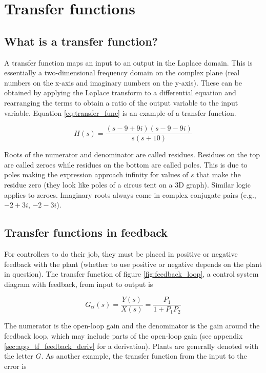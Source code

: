 \section{Transfer functions}

\subsection{What is a transfer function?}

A transfer function maps an input to an output in the Laplace domain. This is
essentially a two-dimensional frequency domain on the complex plane (real
numbers on the x-axis and imaginary numbers on the y-axis). These can be
obtained by applying the Laplace transform to a differential equation and
rearranging the terms to obtain a ratio of the output variable to the input
variable. Equation \ref{eq:transfer_func} is an example of a transfer function.

\begin{equation} \label{eq:transfer_func}
  H(s) = \frac{(s-9+9i)(s-9-9i)}{s(s+10)}
\end{equation}

Roots of the numerator and denominator are called residues. Residues on the top
are called zeroes while residues on the bottom are called poles. This is due to
poles making the expression approach infinity for values of $s$ that make the
residue zero (they look like poles of a circus tent on a 3D graph). Similar
logic applies to zeroes. Imaginary roots always come in complex conjugate pairs
(e.g., $-2 + 3i$, $-2 - 3i$).

\subsection{Transfer functions in feedback}

For \glspl{controller} to do their job, they must be placed in positive or
negative feedback with the \gls{plant} (whether to use positive or negative
depends on the \gls{plant} in question). The transfer function of figure
\ref{fig:feedback_loop}, a control system diagram with feedback, from input to
output is

\begin{equation}
  G_{cl}(s) = \frac{Y(s)}{X(s)} = \frac{P_1}{1 + P_1 P_2}
\end{equation}

The numerator is the \gls{open-loop gain} and the denominator is the gain around
the feedback loop, which may include parts of the \gls{open-loop gain} (see
appendix \ref{sec:app_tf_feedback_deriv} for a derivation). Plants are generally
denoted with the letter $G$. As another example, the transfer function from the
input to the error is

